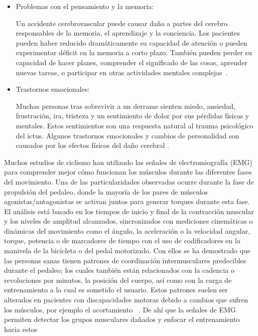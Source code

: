 \begin{itemize}
    \item Problemas con el pensamiento y la memoria:
    
    Un accidente cerebrovascular puede causar daño a partes del cerebro responsables de la memoria, el aprendizaje y la conciencia. Los pacientes pueden haber reducido dramáticamente su capacidad de atención o pueden experimentar déficit en la memoria a
    corto plazo. También pueden perder su capacidad de hacer planes, comprender el significado de las cosas, aprender nuevas tareas, o participar en otras actividades mentales complejas~\cite{post-strok}.
    
    \item Trastornos emocionales:
    
    Muchas personas tras sobrevivir a un derrame sienten miedo, ansiedad, frustración, ira, tristeza y un sentimiento de dolor por sus pérdidas físicas y mentales. Estos sentimientos son una respuesta natural al trauma psicológico del ictus. Algunos trastornos emocionales y cambios de personalidad son causados por los efectos físicos del daño cerebral \cite{post-strok}.
\end{itemize}

Muchos estudios de ciclismo han utilizado las señales de electromiografía (EMG) para comprender mejor cómo funcionan los músculos durante las diferentes fases del movimiento. Una de las particularidades observadas ocurre durante la fase de propulsión del pedaleo, donde la
mayoría de los pares de músculos agonistas/antagonistas se activan juntos para generar torques durante esta fase. El análisis está basado en los tiempos de inicio y final de la contracción muscular y los niveles de amplitud alcanzados, sincronizados con mediciones cinemáticas o dinámicas del movimiento como el ángulo, la aceleración o la velocidad angular, torque, potencia o de marcadores de tiempo con el uso de codificadores en la manivela de la bicicleta o del pedal motorizado. Con ellos se ha demostrado que las
personas sanas tienen patrones de coordinación intermusculares predecibles durante el pedaleo; los cuales también están relacionados con la cadencia o revoluciones por minutos, la posición del cuerpo, así como con la carga de entrenamiento a la cual es sometido el usuario. Estos patrones suelen ser alterados en pacientes con discapacidades motoras debido a cambios que sufren los músculos, por ejemplo el acortamiento ~\cite{johnston2007biomechanical}. De ahí que la señales de EMG permiten detectar los grupos musculares dañados y enfocar el entrenamiento hacia estos ~\cite{hug2009electromyographic, kautz1998relationships}


